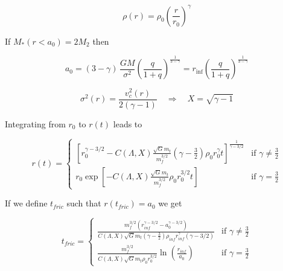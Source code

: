 \documentclass[12pt,twoside,openany]{book}
\begin{document}
\begin{equation}\label{Power low distribution}
    \rho(r)=\rho_0\left(\frac{r}{r_0}\right)^\gamma
\end{equation}





If $M_*(r<a_0)=2M_2$ then 

\begin{equation}\label{a_0 of stellar cusp model}
a_0 = (3 - \gamma)\,\frac{G M}{\sigma^2}
\left(\frac{q}{1 + q}\right)^{\frac{1}{3 - \gamma}}
= r_{\mathrm{inf}}
\left(\frac{q}{1 + q}\right)^{\frac{1}{3 - \gamma}}
\end{equation}


\begin{equation}\label{X of the stellar cusp}
    \sigma^2(r)=\frac{v_c^2(r)}{2(\gamma-1)} \quad \Rightarrow \quad X=\sqrt{\gamma-1}
\end{equation}

Integrating from $r_{0}$ to $r(t)$ leads to

\begin{equation}\label{r(t) of stellar cusp under dynamical friction}
r(t)=
\begin{cases}
\left[r_0^{\gamma-3/2}-C(\Lambda,X)\frac{\sqrt{G}m_t}{m_f^{3/2}}\left(\gamma-\frac{3}{2}\right)\rho_0r_0^{\gamma}t\right]^{\frac{1}{\gamma-3/2}}
& \text{if } \gamma \ne \frac{3}{2} \\[6pt]
r_0\exp\left[-C(\Lambda,X)\frac{\sqrt{G}m_t}{m_f^{3/2}}\rho_0r_0^{3/2}t\right]
& \text{if } \gamma = \frac{3}{2}
\end{cases}
\end{equation}


If we define $t_{fric}$ such that $r(t_{fric})=a_0$ we get


\begin{equation}\label{t_fric of stellar cusp}
t_{fric}=
\begin{cases}
\frac{m_f^{3/2}(r_{inf}^{\gamma-3/2}-a_0^{\gamma-3/2})}{C(\Lambda,X)\sqrt{G}m_t\left(\gamma-\frac{3}{2}\right)\rho_{inf}r_{inf}^{\gamma}(\gamma-3/2)}
& \text{if } \gamma \ne \frac{3}{2} \\[6pt]
\frac{m_f^{3/2}}{C(\Lambda,X)\sqrt{G}m_t\rho_0r_0^{3/2}}  \ln{\left(\frac{r_{inf}}{a_0}\right)}
& \text{if } \gamma = \frac{3}{2}
\end{cases}
\end{equation}
\end{document}
